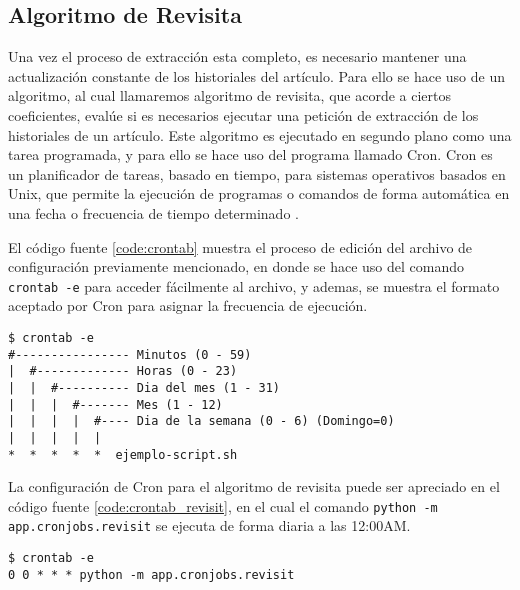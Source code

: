 \subsection{Algoritmo de Revisita}

Una vez el proceso de extracción esta completo,
es necesario mantener una actualización constante de los historiales del artículo.
Para ello se hace uso de un algoritmo, al cual llamaremos algoritmo de revisita, que acorde a ciertos coeficientes, evalúe si
es necesarios ejecutar una petición de extracción de los historiales de un artículo.
Este algoritmo es ejecutado en segundo plano como una tarea programada, y para ello
se hace uso del programa llamado Cron.
Cron es un planificador de tareas, basado en tiempo, para sistemas operativos basados en Unix, que permite la ejecución de programas o comandos de forma automática en una fecha o frecuencia de tiempo determinado \cite{24}.

El código fuente \ref{code:crontab} muestra el proceso de edición del archivo de configuración previamente mencionado, en donde se hace uso del comando \texttt{crontab -e}
para acceder fácilmente al archivo, y ademas, se muestra el formato aceptado por Cron
para asignar la frecuencia de ejecución.

\begin{minipage}{\linewidth}
\begin{lstlisting}[caption={Edición del archivo de configuración de Cron},breaklines=true,label={code:crontab}]
$ crontab -e
#---------------- Minutos (0 - 59)
|  #------------- Horas (0 - 23)
|  |  #---------- Dia del mes (1 - 31)
|  |  |  #------- Mes (1 - 12)
|  |  |  |  #---- Dia de la semana (0 - 6) (Domingo=0)
|  |  |  |  |
*  *  *  *  *  ejemplo-script.sh
\end{lstlisting}
\end{minipage}

La configuración de Cron para el algoritmo de revisita puede ser apreciado en el código fuente \ref{code:crontab_revisit}, en el cual el comando \texttt{python -m app.cronjobs.revisit} se ejecuta de forma diaria a las 12:00AM.

\begin{minipage}{\linewidth}
\begin{lstlisting}[caption={Edición del archivo de configuración de Cron},breaklines=true,label={code:crontab_revisit}]
$ crontab -e
0 0 * * * python -m app.cronjobs.revisit
\end{lstlisting}
\end{minipage}

